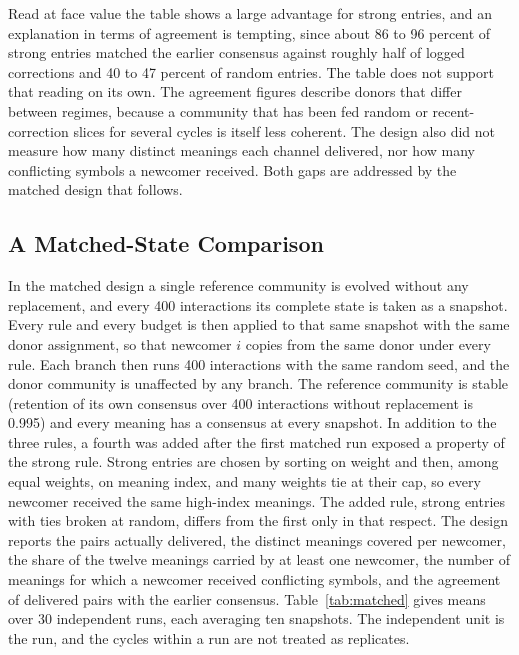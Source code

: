 \documentclass[11pt]{article}
\begin{document}
Read at face value the table shows a large advantage for strong entries, and an explanation in terms of agreement is tempting, since about 86 to 96 percent of strong entries matched the earlier consensus against roughly half of logged corrections and 40 to 47 percent of random entries. The table does not support that reading on its own. The agreement figures describe donors that differ between regimes, because a community that has been fed random or recent-correction slices for several cycles is itself less coherent. The design also did not measure how many distinct meanings each channel delivered, nor how many conflicting symbols a newcomer received. Both gaps are addressed by the matched design that follows.

\subsection{A Matched-State Comparison}

In the matched design a single reference community is evolved without any replacement, and every 400 interactions its complete state is taken as a snapshot. Every rule and every budget is then applied to that same snapshot with the same donor assignment, so that newcomer $i$ copies from the same donor under every rule. Each branch then runs 400 interactions with the same random seed, and the donor community is unaffected by any branch. The reference community is stable (retention of its own consensus over 400 interactions without replacement is 0.995) and every meaning has a consensus at every snapshot. In addition to the three rules, a fourth was added after the first matched run exposed a property of the strong rule. Strong entries are chosen by sorting on weight and then, among equal weights, on meaning index, and many weights tie at their cap, so every newcomer received the same high-index meanings. The added rule, strong entries with ties broken at random, differs from the first only in that respect. The design reports the pairs actually delivered, the distinct meanings covered per newcomer, the share of the twelve meanings carried by at least one newcomer, the number of meanings for which a newcomer received conflicting symbols, and the agreement of delivered pairs with the earlier consensus. Table~\ref{tab:matched} gives means over 30 independent runs, each averaging ten snapshots. The independent unit is the run, and the cycles within a run are not treated as replicates.
\end{document}
